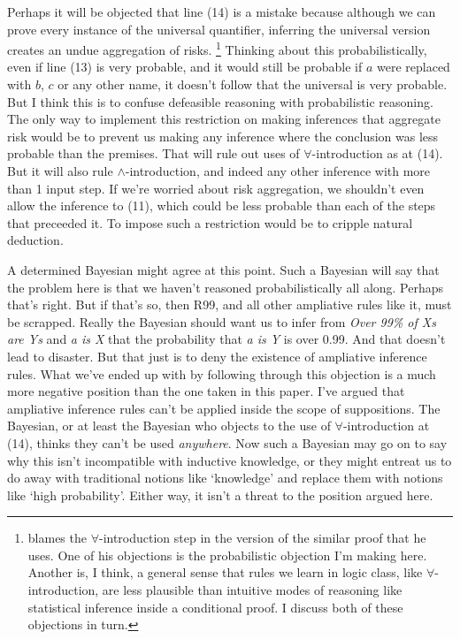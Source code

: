 Perhaps it will be objected that line (14) is a mistake because although we can prove every instance of the universal quantifier, inferring the universal version creates an undue aggregation of risks. \footnote{\citet{Dogramaci2010} blames the $\forall$-introduction step in the version of the similar proof that he uses. One of his objections is the probabilistic objection I'm making here. Another is, I think, a general sense that rules we learn in logic class, like $\forall$-introduction, are less plausible than intuitive modes of reasoning like statistical inference inside a conditional proof. I discuss both of these objections in turn.} Thinking about this probabilistically, even if line (13) is very probable, and it would still be probable if $a$ were replaced with $b$, $c$ or any other name, it doesn't follow that the universal is very probable. But I think this is to confuse defeasible reasoning with probabilistic reasoning. The only way to implement this restriction on making inferences that aggregate risk would be to prevent us making any inference where the conclusion was less probable than the premises. That will rule out uses of $\forall$-introduction as at (14). But it will also rule $\wedge$-introduction, and indeed any other inference with more than 1 input step. If we're worried about risk aggregation, we shouldn't even allow the inference to (11), which could be less probable than each of the steps that preceeded it. To impose such a restriction would be to cripple natural deduction. 

A determined Bayesian might agree at this point. Such a Bayesian will say that the problem here is that we haven't reasoned probabilistically all along. Perhaps that's right. But if that's so, then R99, and all other ampliative rules like it, must be scrapped. Really the Bayesian should want us to infer from  \textit{Over 99\% of Xs are Ys} and \textit{a is X} that the probability that \textit{a is Y} is over 0.99. And that doesn't lead to disaster. But that just is to deny the existence of ampliative inference rules. What we've ended up with by following through this objection is a much more negative position than the one taken in this paper. I've argued that ampliative inference rules can't be applied inside the scope of suppositions. The Bayesian, or at least the Bayesian who objects to the use of $\forall$-introduction at (14), thinks they can't be used \textit{anywhere}. Now such a Bayesian may go on to say why this isn't incompatible with inductive knowledge, or they might entreat us to do away with traditional notions like `knowledge' and replace them with notions like `high probability'. Either way, it isn't a threat to the position argued here.

